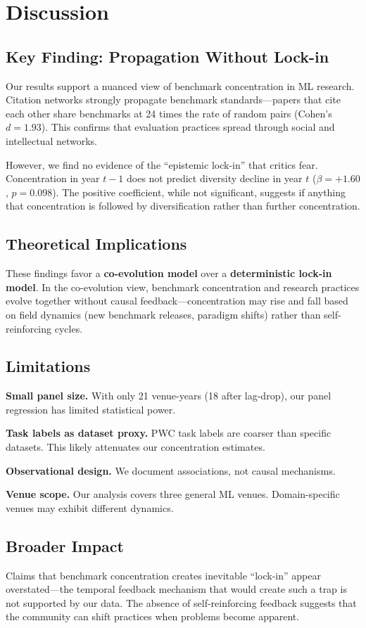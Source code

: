 \section{Discussion}

\subsection{Key Finding: Propagation Without Lock-in}

Our results support a nuanced view of benchmark concentration in ML research. Citation networks strongly propagate benchmark standards---papers that cite each other share benchmarks at 24 times the rate of random pairs (Cohen's $d = 1.93$). This confirms that evaluation practices spread through social and intellectual networks.

However, we find no evidence of the ``epistemic lock-in'' that critics fear. Concentration in year $t-1$ does not predict diversity decline in year $t$ ($\beta = +1.60$, $p = 0.098$). The positive coefficient, while not significant, suggests if anything that concentration is followed by diversification rather than further concentration.

\subsection{Theoretical Implications}

These findings favor a \textbf{co-evolution model} over a \textbf{deterministic lock-in model}. In the co-evolution view, benchmark concentration and research practices evolve together without causal feedback---concentration may rise and fall based on field dynamics (new benchmark releases, paradigm shifts) rather than self-reinforcing cycles.

\subsection{Limitations}

\textbf{Small panel size.} With only 21 venue-years (18 after lag-drop), our panel regression has limited statistical power.

\textbf{Task labels as dataset proxy.} PWC task labels are coarser than specific datasets. This likely attenuates our concentration estimates.

\textbf{Observational design.} We document associations, not causal mechanisms.

\textbf{Venue scope.} Our analysis covers three general ML venues. Domain-specific venues may exhibit different dynamics.

\subsection{Broader Impact}

Claims that benchmark concentration creates inevitable ``lock-in'' appear overstated---the temporal feedback mechanism that would create such a trap is not supported by our data. The absence of self-reinforcing feedback suggests that the community can shift practices when problems become apparent.

